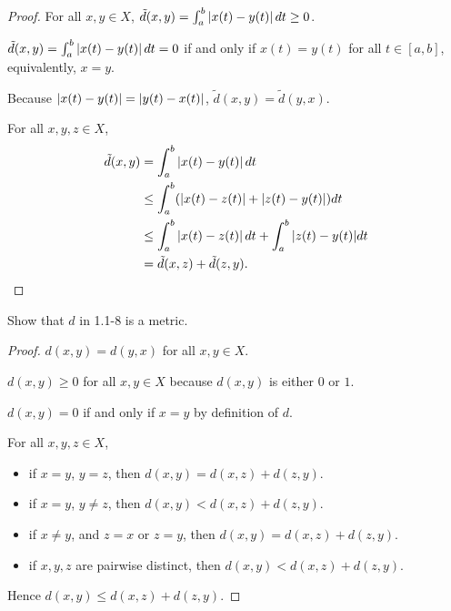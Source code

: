 \begin{proof}
    For all $x, y\in X$, $\tilde{d}(x, y) = \int^{b}_{a}\left\vert{x(t) - y(t)}\right\vert dt\geq 0$.

    $\tilde{d}(x, y) = \int^{b}_{a}\left\vert{x(t) - y(t)}\right\vert dt = 0$ if and only if $x(t) = y(t)$ for all $t\in [a, b]$, equivalently, $x = y$.

    Because $\left\vert{x(t) - y(t)}\right\vert = \left\vert{y(t) - x(t)}\right\vert$, $\tilde{d}(x, y) = \tilde{d}(y, x)$.

    For all $x, y, z\in X$,
    \begin{align*}
        \tilde{d}(x, y) & = \int^{b}_{a}\left\vert{x(t) - y(t)}\right\vert dt                                        \\
                        & \leq \int^{b}_{a}(\left\vert{x(t) - z(t)}\right\vert + \left\vert{z(t) - y(t)}\right\vert)dt               \\
                        & \leq \int^{b}_{a}\left\vert{x(t) - z(t)}\right\vert dt + \int^{b}_{a}{\left\vert{z(t) - y(t)}\right\vert}dt \\
                        & = \tilde{d}(x, z) + \tilde{d}(z, y).\qedhere
    \end{align*}
\end{proof}

\begin{exercise}\label{chapter1:section1:exercise9}
    Show that $d$ in 1.1-8 is a metric.
\end{exercise}

\begin{proof}
    $d(x, y) = d(y, x)$ for all $x, y\in X$.

    $d(x, y)\geq 0$ for all $x, y\in X$ because $d(x, y)$ is either $0$ or $1$.

    $d(x, y) = 0$ if and only if $x = y$ by definition of $d$.

    For all $x, y, z\in X$,
    \begin{itemize}
        \item if $x = y$, $y = z$, then $d(x, y) = d(x, z) + d(z, y)$.
        \item if $x = y$, $y\ne z$, then $d(x, y) < d(x, z) + d(z, y)$.
        \item if $x\ne y$, and $z = x$ or $z = y$, then $d(x, y) = d(x, z) + d(z, y)$.
        \item if $x, y, z$ are pairwise distinct, then $d(x, y) < d(x, z) + d(z, y)$.
    \end{itemize}

    Hence $d(x, y)\leq d(x, z) + d(z, y)$.
\end{proof}

